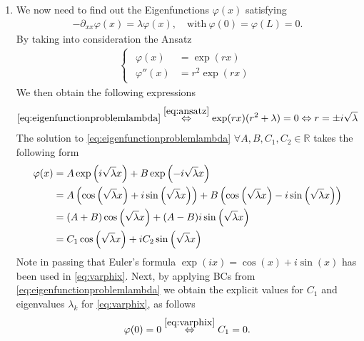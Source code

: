 \documentclass[12pt]{article}
\begin{document}
\begin{enumerate}
	\item We now need to find out the Eigenfunctions $\varphi(x)$ satisfying
	      \begin{align}
		      \label{eq:eigenfunctionproblemlambda}
		      -\partial_{xx}\varphi(x) = \lambda\varphi(x),
		      \quad\text{with}\ \varphi(0)=\varphi(L)=0.
	      \end{align}
	      By taking into consideration the Ansatz
	      \begin{align}
		      \label{eq:ansatz}
		      \begin{cases}
			      \begin{aligned}
				      \varphi(x)   & = \exp(rx)      \\
				      \varphi''(x) & = r^{2}\exp(rx)
			      \end{aligned}
		      \end{cases}
	      \end{align}
	      We then obtain the following expressions
	      \begin{align}
		      \eqref{eq:eigenfunctionproblemlambda}
		      \stackrel{\eqref{eq:ansatz}}{\Leftrightarrow}
		      \exp(rx)(r^{2} + \lambda) = 0
		      \Leftrightarrow
		      r = \pm i\sqrt{\lambda}
	      \end{align}
	      The solution to \eqref{eq:eigenfunctionproblemlambda} $\forall A,B,C_{1},C_{2} \in \mathbb{R}$ takes the following form 
	      \begin{align}
		      \label{eq:varphix}
		      \varphi(x)
		       & = A\exp\left(i\sqrt{\lambda}x\right) + B\exp\left(-i\sqrt{\lambda}x\right) \notag          \\
		       & = A\left( \cos\left(\sqrt{\lambda}x\right) + i\sin\left(\sqrt{\lambda}x\right) \right)
		      + B\left( \cos\left(\sqrt{\lambda}x\right) - i\sin\left(\sqrt{\lambda}x\right) \right) \notag \\
		       & = (A+B)\cos\left(\sqrt{\lambda}x\right) + (A-B)i\sin\left(\sqrt{\lambda}x\right) \notag    \\
		       & = C_{1}\cos\left(\sqrt{\lambda}x\right) + iC_{2}\sin\left(\sqrt{\lambda}x\right)
	      \end{align}
	      Note in passing that Euler's formula $\exp(ix) = \cos(x) +i\sin(x)$ has been used in \eqref{eq:varphix}.
	      Next, by applying BCs from \eqref{eq:eigenfunctionproblemlambda}
	      we obtain the explicit values for $C_{1}$ and eigenvalues $\lambda_{k}$ for \eqref{eq:varphix}, as follows
	      \begin{align}
		       & \varphi(0)=0 \stackrel{\eqref{eq:varphix}}{\Leftrightarrow} C_{1} = 0. \label{eq:C1} \\

\end{align}
\end{enumerate}
\end{document}

